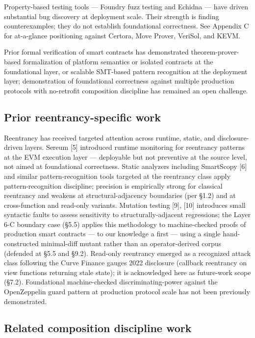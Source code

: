Property-based testing tools --- Foundry fuzz testing and Echidna ---
have driven substantial bug discovery at deployment scale. Their
strength is finding counterexamples; they do not establish foundational
correctness. See Appendix C for at-a-glance positioning against Certora,
Move Prover, VeriSol, and KEVM.

Prior formal verification of smart contracts has demonstrated
theorem-prover-based formalization of platform semantics or isolated
contracts at the foundational layer, or scalable SMT-based pattern
recognition at the deployment layer; demonstration of foundational
correctness against multiple production protocols with no-retrofit
composition discipline has remained an open challenge.

\subsection{Prior reentrancy-specific
work}\label{prior-reentrancy-specific-work}

Reentrancy has received targeted attention across runtime, static, and
disclosure-driven layers. Sereum {[}5{]} introduced runtime monitoring
for reentrancy patterns at the EVM execution layer --- deployable but
not preventive at the source level, not aimed at foundational
correctness. Static analyzers including SmartScopy {[}6{]} and similar
pattern-recognition tools targeted at the reentrancy class apply
pattern-recognition discipline; precision is empirically strong for
classical reentrancy and weakens at structural-adjacency boundaries (per
§1.2) and at cross-function and read-only variants. Mutation testing
{[}9{]}, {[}10{]} introduces small syntactic faults to assess
sensitivity to structurally-adjacent regressions; the Layer 6-C boundary
case (§5.5) applies this methodology to machine-checked proofs of
production smart contracts --- to our knowledge a first --- using a
single hand-constructed minimal-diff mutant rather than an
operator-derived corpus (defended at §5.5 and §9.2). Read-only
reentrancy emerged as a recognized attack class following the Curve
Finance gauges 2022 disclosure (callback reentrancy on view functions
returning stale state); it is acknowledged here as future-work scope
(§7.2). Foundational machine-checked discriminating-power against the
OpenZeppelin guard pattern at production protocol scale has not been
previously demonstrated.

\subsection{Related composition discipline
work}\label{related-composition-discipline-work}

